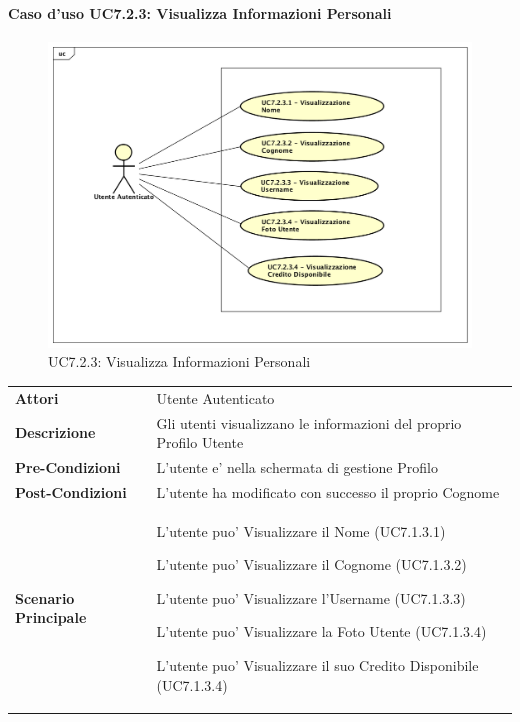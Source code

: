 \paragraph{Caso d'uso UC7.2.3:  Visualizza Informazioni Personali}
\label{UC7_2_3}
\begin{figure}[ht]
	\centering
	\includegraphics[scale=0.45]{UML/UC7_2_3.png}
	\caption{UC7.2.3: Visualizza Informazioni Personali}
\end{figure}

\FloatBarrier
\begin{tabular}{ l | p{11cm}}
	\hline
	\rowcolor{Gray}
	 \multicolumn{2}{c}{UC7.2.3:  VIsualizza Informazioni Personali} \\
	 \hline
	\textbf{Attori} & Utente Autenticato \\
	\textbf{Descrizione} & Gli utenti visualizzano le informazioni del proprio Profilo Utente\\
	\textbf{Pre-Condizioni} & L'utente e' nella schermata di gestione Profilo\\
	\textbf{Post-Condizioni} & L'utente ha modificato con successo il proprio Cognome \\
	\textbf{Scenario Principale} & 
	\begin{enumerate*}[label=(\arabic*.),itemjoin={\newline}]
		\item L'utente puo' Visualizzare il Nome (UC7.1.3.1)
		\item L'utente puo' Visualizzare il Cognome (UC7.1.3.2)
		\item L'utente puo' Visualizzare l'Username (UC7.1.3.3)
		\item L'utente puo' Visualizzare la Foto Utente (UC7.1.3.4)
		\item L'utente puo' Visualizzare il suo Credito Disponibile (UC7.1.3.4)
	\end{enumerate*}\\
\end{tabular}
